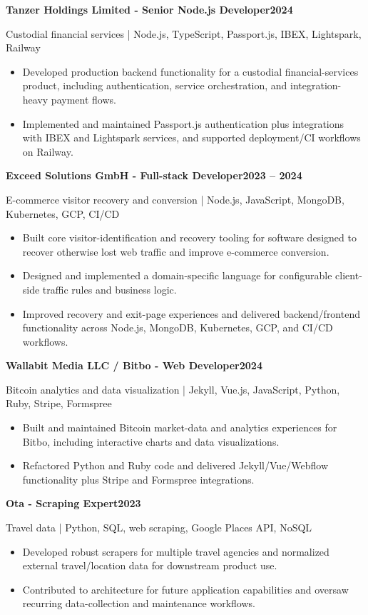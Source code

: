 \documentclass[10pt,a4paper]{article}
\newcommand{\client}[3]{%
  \needspace{4\baselineskip}%
  \vspace{3pt}%
  {\bfseries #1}\hfill{\small\bfseries #2}\par
  {\small\color{muted} #3}\par
}
\begin{document}
\client{Tanzer Holdings Limited - Senior Node.js Developer}{2024}{Custodial financial services | Node.js, TypeScript, Passport.js, IBEX, Lightspark, Railway}
\begin{itemize}
  \item Developed production backend functionality for a custodial financial-services product, including authentication, service orchestration, and integration-heavy payment flows.
  \item Implemented and maintained Passport.js authentication plus integrations with IBEX and Lightspark services, and supported deployment/CI workflows on Railway.
\end{itemize}

\client{Exceed Solutions GmbH - Full-stack Developer}{2023 -- 2024}{E-commerce visitor recovery and conversion | Node.js, JavaScript, MongoDB, Kubernetes, GCP, CI/CD}
\begin{itemize}
  \item Built core visitor-identification and recovery tooling for software designed to recover otherwise lost web traffic and improve e-commerce conversion.
  \item Designed and implemented a domain-specific language for configurable client-side traffic rules and business logic.
  \item Improved recovery and exit-page experiences and delivered backend/frontend functionality across Node.js, MongoDB, Kubernetes, GCP, and CI/CD workflows.
\end{itemize}

\client{Wallabit Media LLC / Bitbo - Web Developer}{2024}{Bitcoin analytics and data visualization | Jekyll, Vue.js, JavaScript, Python, Ruby, Stripe, Formspree}
\begin{itemize}
  \item Built and maintained Bitcoin market-data and analytics experiences for Bitbo, including interactive charts and data visualizations.
  \item Refactored Python and Ruby code and delivered Jekyll/Vue/Webflow functionality plus Stripe and Formspree integrations.
\end{itemize}

\client{Ota - Scraping Expert}{2023}{Travel data | Python, SQL, web scraping, Google Places API, NoSQL}
\begin{itemize}
  \item Developed robust scrapers for multiple travel agencies and normalized external travel/location data for downstream product use.
  \item Contributed to architecture for future application capabilities and oversaw recurring data-collection and maintenance workflows.
\end{itemize}
\end{document}

